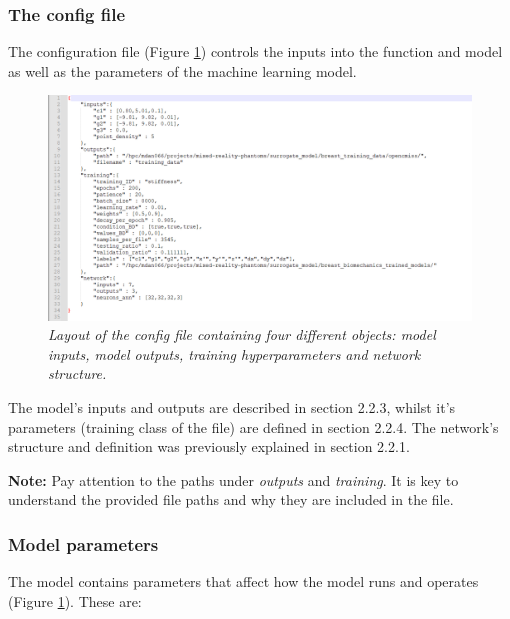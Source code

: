 \documentclass[11pt]{article}
\begin{document}
\subsubsection{The config file}
The configuration file (Figure \ref{fig2}) controls the inputs into the function and model as well as the parameters of the machine learning model.

\begin{figure}[H]
    \centering
    \includegraphics[scale=1.1]{Images/breast/breast_opencmiss_config.png}
    \caption{\textit{\label{fig2}Layout of the config file containing four different objects: model inputs, model outputs, training hyperparameters and network structure.}}
\end{figure}

The model's inputs and outputs are described in section 2.2.3, whilst it's parameters (training class of the file) are defined in section 2.2.4. The network's structure and definition was previously explained in section 2.2.1. 

\textbf{Note:} Pay attention to the paths under \textit{outputs} and \textit{training}. It is key to understand the provided file paths and why they are included in the file. 

\subsubsection{Model parameters}
The model contains parameters that affect how the model runs and
operates (Figure \ref{fig2}). These are:
\end{document}
